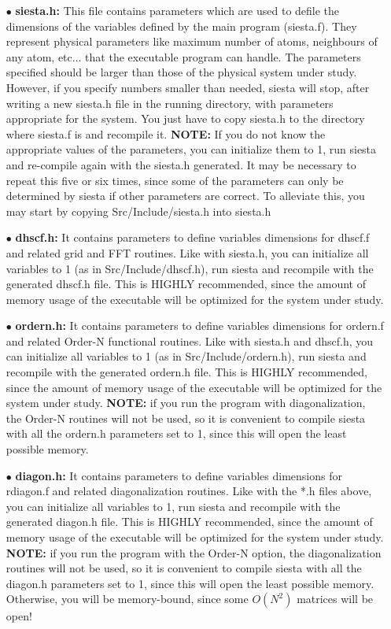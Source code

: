 \begin{itemize}

\item[$\bullet$] {\bf siesta.h:}
This file contains parameters which are used
to defile the dimensions of the variables defined by the
main program (siesta.f).  They represent physical parameters
like maximum number of atoms, neighbours of any atom, etc... 
that the executable
program can handle. The parameters specified should be larger than
those of the physical system under study.  However, if you 
specify numbers smaller than needed, siesta will stop, after
writing a new siesta.h file in the running directory, 
with parameters appropriate for the system. You just have
to copy siesta.h to the directory where siesta.f is and recompile it.
{\bf NOTE:} If you do not know the appropriate values of the parameters,
you can initialize them to 1, run siesta and re-compile again with 
the siesta.h generated.  It may be necessary to repeat this five or six
times, since some of the parameters can only be determined by siesta
if other parameters are correct. To alleviate this, you may start by
copying Src/Include/siesta.h into siesta.h 

\item[$\bullet$] 
{\bf dhscf.h:} 
It contains parameters to define variables dimensions for
dhscf.f and related grid and FFT routines. Like with siesta.h,
you can initialize all variables to 1 (as in Src/Include/dhscf.h), 
run siesta and recompile with the generated dhscf.h file.  
This is HIGHLY recommended, since the amount of memory usage of the 
executable will be optimized for the system under study.

\item[$\bullet$] 
{\bf ordern.h:} 
It contains parameters to define variables dimensions for
ordern.f and related Order-N functional routines. Like with siesta.h
and dhscf.h, you can initialize all variables to 1 
(as in Src/Include/ordern.h), run siesta and
recompile with the generated ordern.h file.  This is HIGHLY recommended,
since the amount of memory usage of the executable will be optimized 
for the system under study.  {\bf NOTE:} if you run the program 
with diagonalization, the Order-N routines will not be used, so
it is convenient to compile siesta with all the ordern.h parameters
set to 1, since this will open the least possible memory. 

\item[$\bullet$] 
{\bf diagon.h:}
It contains parameters to define variables dimensions for
rdiagon.f and related diagonalization routines. Like with the *.h
files above, you can initialize all variables to 1, run siesta and
recompile with the generated diagon.h file.  This is HIGHLY recommended,
since the amount of memory usage of the executable will be optimized 
for the system under study.  {\bf NOTE:} if you run the program 
with the Order-N option, the diagonalization routines will not be used, so
it is convenient to compile siesta with all the diagon.h parameters
set to 1, since this will open the least possible memory. Otherwise, 
you will be memory-bound, since some $O(N^2)$ matrices will be open!


\end{itemize}
